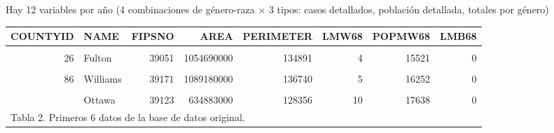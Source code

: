 \documentclass[
  12pt,
]{article}
\begin{document}
Hay 12 variables por año (4 combinaciones de género-raza × 3 tipos:
casos detallados, población detallada, totales por género)

\begingroup\fontsize{9}{11}\selectfont

\begin{longtable}{rlrrrrrr}
\toprule
\textbf{COUNTYID} & \textbf{NAME} & \textbf{FIPSNO} & \textbf{AREA} & \textbf{PERIMETER} & \textbf{LMW68} & \textbf{POPMW68} & \textbf{LMB68}\\
\midrule
\cellcolor{gray!10}{48} & \cellcolor{gray!10}{Lucas} & \cellcolor{gray!10}{39095} & \cellcolor{gray!10}{873382000} & \cellcolor{gray!10}{164533} & \cellcolor{gray!10}{128} & \cellcolor{gray!10}{205421} & \cellcolor{gray!10}{19}\\
26 & Fulton & 39051 & 1054690000 & 134891 & 4 & 15521 & 0\\
\cellcolor{gray!10}{28} & \cellcolor{gray!10}{Geauga} & \cellcolor{gray!10}{39055} & \cellcolor{gray!10}{1005750000} & \cellcolor{gray!10}{146204} & \cellcolor{gray!10}{4} & \cellcolor{gray!10}{30415} & \cellcolor{gray!10}{0}\\
86 & Williams & 39171 & 1089180000 & 136740 & 5 & 16252 & 0\\
\cellcolor{gray!10}{18} & \cellcolor{gray!10}{Cuyahoga} & \cellcolor{gray!10}{39035} & \cellcolor{gray!10}{1242480000} & \cellcolor{gray!10}{173664} & \cellcolor{gray!10}{435} & \cellcolor{gray!10}{677185} & \cellcolor{gray!10}{87}\\
\addlinespace
62 & Ottawa & 39123 & 634883000 & 128356 & 10 & 17638 & 0\\
\bottomrule
\multicolumn{8}{l}{\rule{0pt}{1em}Tabla 2. Primeros 6 datos de la base de datos original.}\\
\end{longtable}
\endgroup{}

\begingroup\fontsize{9}{11}\selectfont
\end{document}
